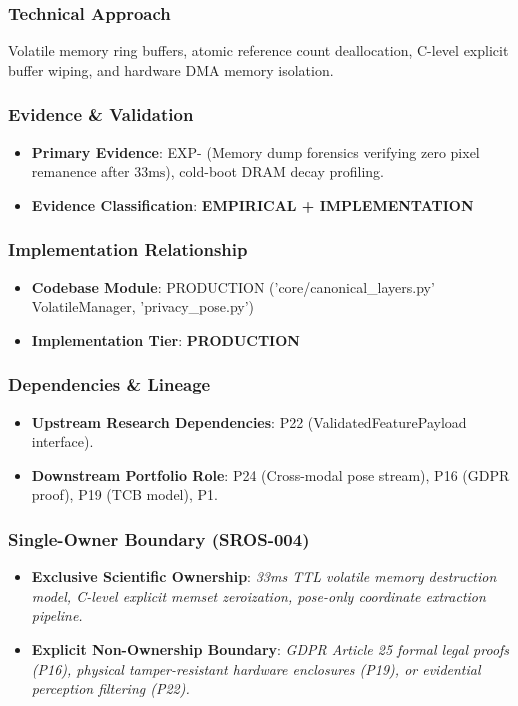 \documentclass[11pt,letterpaper]{article}
\begin{document}
\subsubsection{Technical Approach}
Volatile memory ring buffers, atomic reference count deallocation, C-\allowbreak level explicit buffer wiping, and hardware DMA memory isolation.

\subsubsection{Evidence \& Validation}
\begin{itemize}[leftmargin=*]
    \item \textbf{Primary Evidence}: EXP- (Memory dump forensics verifying zero pixel remanence after $33\text{ms}$), cold-\allowbreak boot DRAM decay profiling.
    \item \textbf{Evidence Classification}: \textbf{EMPIRICAL + IMPLEMENTATION}
\end{itemize}

\subsubsection{Implementation Relationship}
\begin{itemize}[leftmargin=*]
    \item \raggedright \textbf{Codebase Module}: PRODUCTION ('core/\allowbreak canonical\_\allowbreak layers.py' VolatileManager, 'privacy\_\allowbreak pose.py')
    \item \textbf{Implementation Tier}: \textbf{PRODUCTION}
\end{itemize}

\subsubsection{Dependencies \& Lineage}
\begin{itemize}[leftmargin=*]
    \item \textbf{Upstream Research Dependencies}: P22 (ValidatedFeaturePayload interface).
    \item \textbf{Downstream Portfolio Role}: P24 (Cross-\allowbreak modal pose stream), P16 (GDPR proof), P19 (TCB model), P1.
\end{itemize}

\subsubsection{Single-Owner Boundary (SROS-004)}
\begin{itemize}[leftmargin=*]
    \item \textbf{Exclusive Scientific Ownership}: \textit{33ms TTL volatile memory destruction model, C-\allowbreak level explicit memset zeroization, pose-\allowbreak only coordinate extraction pipeline.}
    \item \textbf{Explicit Non-Ownership Boundary}: \textit{GDPR Article 25 formal legal proofs (P16), physical tamper-\allowbreak resistant hardware enclosures (P19), or evidential perception filtering (P22).}
\end{itemize}
\end{document}
